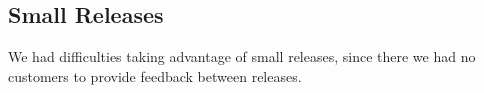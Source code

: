 \subsection{Small Releases}
We had difficulties taking advantage of small releases, since there we had no customers to provide feedback between releases.